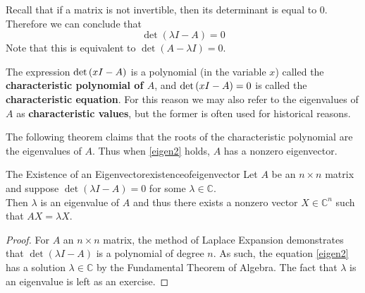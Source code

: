Recall that if a matrix
is not invertible, then its determinant is equal to $0$.  Therefore we
can conclude that
\begin{equation}
\det \left( \lambda I - A\right) =0  \label{eigen2}
\end{equation}
Note that this is equivalent to $\det \left(A- \lambda I \right) =0$. 

The expression $\det \left( x I-A\right) $ is a polynomial (in
the variable $x$) called the
\textbf{characteristic polynomial of $A$}, and 
$\det \left( x I-A\right) =0$ is called the \textbf{characteristic
equation}. For this reason we may also refer to
the eigenvalues of $A$ as \textbf{characteristic values}, but the
former is often used for historical reasons.

The following theorem claims that the roots of the characteristic
polynomial are the eigenvalues of $A$.  Thus when \ref{eigen2}
holds, $A$ has a nonzero eigenvector.

\begin{theorem}{The Existence of an Eigenvector}{existenceofeigenvector}
Let $A$ be an $n\times n$ matrix and suppose $\det \left( \lambda I -
A\right) =0$ for some $ \lambda \in \mathbb{C}$.  \\
Then $\lambda$ is an eigenvalue of $A$ and thus there exists a nonzero
vector $X \in \mathbb{C}^{n}$ such that $AX=\lambda X$. 
\end{theorem}

\begin{proof}
For $A$ an $n\times n$ matrix, the method of Laplace
Expansion demonstrates that $\det \left( \lambda I - A \right) $ is a
polynomial of degree $n.$ As such, the equation
\ref{eigen2} has a solution $\lambda \in \mathbb{C}$ by the Fundamental
Theorem of Algebra. The fact that $\lambda$ is an eigenvalue is left as an exercise. 
\end{proof}
